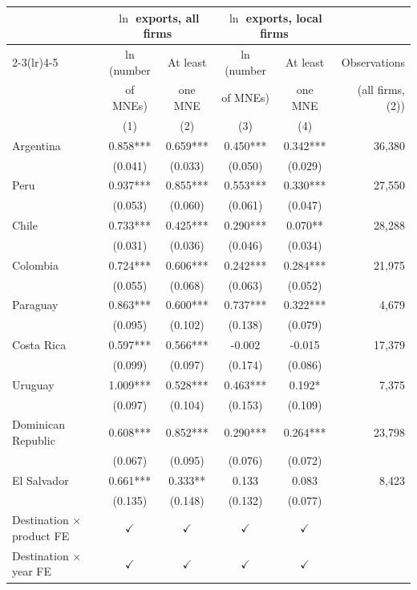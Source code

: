 \begin{tabular}{lccccr}
\toprule
 & \multicolumn{2}{c}{$\ln$ exports, all firms} & \multicolumn{2}{c}{$\ln$ exports, local firms} & \\
\cmidrule(lr){2-3}\cmidrule(lr){4-5}
 & $\ln$(number & At least & $\ln$(number & At least & Observations \\
 & of MNEs) & one MNE & of MNEs) & one MNE & (all firms, (2)) \\
 & (1) & (2) & (3) & (4) & \\
\midrule
Argentina & 0.858*** & 0.659*** & 0.450*** & 0.342*** & 36,380 \\
 & (0.041) & (0.033) & (0.050) & (0.029) &  \\
Peru & 0.937*** & 0.855*** & 0.553*** & 0.330*** & 27,550 \\
 & (0.053) & (0.060) & (0.061) & (0.047) &  \\
Chile & 0.733*** & 0.425*** & 0.290*** & 0.070** & 28,288 \\
 & (0.031) & (0.036) & (0.046) & (0.034) &  \\
Colombia & 0.724*** & 0.606*** & 0.242*** & 0.284*** & 21,975 \\
 & (0.055) & (0.068) & (0.063) & (0.052) &  \\
Paraguay & 0.863*** & 0.600*** & 0.737*** & 0.322*** & 4,679 \\
 & (0.095) & (0.102) & (0.138) & (0.079) &  \\
Costa Rica & 0.597*** & 0.566*** & -0.002 & -0.015 & 17,379 \\
 & (0.099) & (0.097) & (0.174) & (0.086) &  \\
Uruguay & 1.009*** & 0.528*** & 0.463*** & 0.192* & 7,375 \\
 & (0.097) & (0.104) & (0.153) & (0.109) &  \\
Dominican Republic & 0.608*** & 0.852*** & 0.290*** & 0.264*** & 23,798 \\
 & (0.067) & (0.095) & (0.076) & (0.072) &  \\
El Salvador & 0.661*** & 0.333** & 0.133 & 0.083 & 8,423 \\
 & (0.135) & (0.148) & (0.132) & (0.077) &  \\
\midrule
Destination $\times$ product FE & $\checkmark$ & $\checkmark$ & $\checkmark$ & $\checkmark$ & \\
Destination $\times$ year FE & $\checkmark$ & $\checkmark$ & $\checkmark$ & $\checkmark$ & \\
\bottomrule
\end{tabular}
